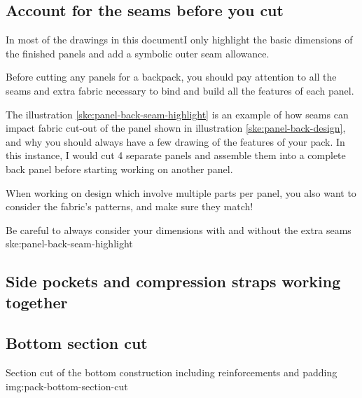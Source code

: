 \subsection{Account for the seams before you cut}\label{sec:seams-and-cutouts}

In most of the drawings in this documentI only highlight the basic dimensions of the finished panels and add a symbolic outer seam allowance.

Before cutting any panels for a backpack, you should pay attention to all the seams and extra fabric necessary to bind and build all the features of each panel.

The illustration \ref{ske:panel-back-seam-highlight} is an example of how seams can impact fabric cut-out of the panel shown in illustration \ref{ske:panel-back-design}, and why you should always have a few drawing of the features of your pack. In this instance, I would cut 4 separate panels and assemble them into a complete back panel before starting working on another panel.

\begin{note}
  When working on design which involve multiple parts per panel, you also want to consider the fabric's patterns, and make sure they match!
\end{note}

{Be careful to always consider your dimensions with and without the extra seams}
{ske:panel-back-seam-highlight}

\subsection{Side pockets and compression straps working together}\label{sec:construction-side-pockets}

\subsection{Bottom section cut}

{Section cut of the bottom construction including reinforcements and padding}
{img:pack-bottom-section-cut}
